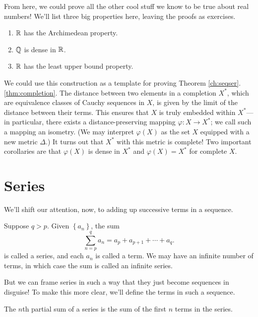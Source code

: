 \documentclass[../m131main.tex]{subfiles}
\begin{document}
From here, we could prove all the other cool stuff we know to be true about real numbers!
We'll list three big properties here, leaving the proofs as exercises.

\begin{theorem}[Properties of $\R$]
    \begin{enumerate}[label=(\alph*)]
        \item $\R$ has the Archimedean property.
        \item $\mathbb{Q}$ is dense in $\R$.
        \item $\R$ has the least upper bound property.
    \end{enumerate}
\end{theorem}

We could use this construction as a template for proving Theorem \ref{ch:seqser}.\ref{thm:completion}.
The distance between two elements in a completion $X^*$, which are equivalence classes of Cauchy sequences in $X$, is given by the limit of the distance between their terms.
This ensures that $X$ is truly embedded within $X^*$---in particular, there exists a distance-preserving mapping $\varphi : X \to X^*$; we call such a mapping an isometry.
(We may interpret $\varphi(X)$ as the set $X$ equipped with a new metric $\Delta$.)
It turns out that $X^*$ with this metric is complete!
Two important corollaries are that $\varphi(X)$ is dense in $X^*$ and $\varphi(X) = X^*$ for complete $X$.

\section{Series}
We'll shift our attention, now, to adding up successive terms in a sequence.

\begin{definition}[Series]
    Suppose $q > p$.
    Given $\left\{ a_n \right\}$, the sum
    \[ \sum_{n=p}^{q} a_n = a_p + a_{p+1} + \cdots + a_q. \]
    is called a series, and each $a_n$ is called a term.
    We may have an infinite number of terms, in which case the sum is called an infinite series.
\end{definition}

But we can frame series in such a way that they just become sequences in disguise!
To make this more clear, we'll define the terms in such a sequence.

\begin{definition}
    The $n$th partial sum of a series is the sum of the first $n$ terms in the series.
\end{definition}
\end{document}
